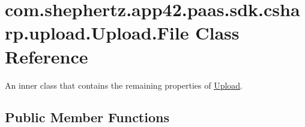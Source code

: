 \hypertarget{classcom_1_1shephertz_1_1app42_1_1paas_1_1sdk_1_1csharp_1_1upload_1_1_upload_1_1_file}{\section{com.\+shephertz.\+app42.\+paas.\+sdk.\+csharp.\+upload.\+Upload.\+File Class Reference}
\label{classcom_1_1shephertz_1_1app42_1_1paas_1_1sdk_1_1csharp_1_1upload_1_1_upload_1_1_file}
}


An inner class that contains the remaining properties of \hyperlink{classcom_1_1shephertz_1_1app42_1_1paas_1_1sdk_1_1csharp_1_1upload_1_1_upload}{Upload}.  


\subsection*{Public Member Functions}
